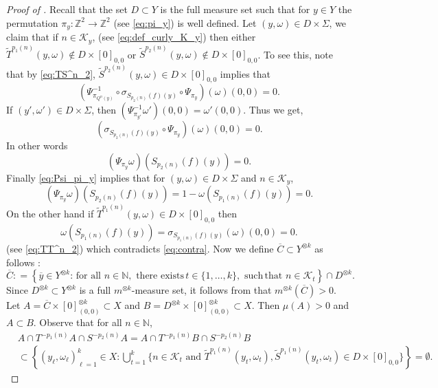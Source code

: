 \documentclass[12pt,reqno]{amsart}
\newcommand{\N}{\mathbb{N}}
\newcommand{\Z}{\mathbb{Z}}
\newcommand{\kay}{\mathcal{K}}
\newcommand{\TT}{\widetilde{T}}
\newcommand{\TS}{\widetilde{S}}
\theoremstyle{definition}
\begin{document}
\begin{proof}[Proof of ] Recall that the set $D \subset Y$ is the full measure set such that for $y \in Y$ the permutation $\pi_y: \Z^2 \rightarrow \Z^2$ (see \eqref{eq:pi_y}) is well defined. Let $(y,\omega) \in D \times \Sigma$, we claim that if $n \in \mathcal{K}_y$, (see \eqref{eq:def_curly_K_y}) then either $\TT^{p_1(n)} (y,\omega) \notin D \times [0]_{0,0} $ or $\TS^{p_2(n)} (y,\omega) \notin D \times [0]_{0,0}$. To see this, note that by \eqref{eq:TS^n_2}, $\TS^{p_2(n)} (y,\omega) \in D \times [0]_{0,0}$ implies that
\[
(\Psi^{-1}_{\pi_{Q^n(y)}} \circ \sigma_{S_{p_2(n)}(f)(y)} \circ \Psi_{\pi_y}) (\omega ) (0,0) = 0.
\]
If $(y',\omega') \in D \times \Sigma$, then $(\Psi^{-1}_{\pi_{y'}}\omega') (0,0) = \omega' (0,0)$. Thus we get,
\[
( \sigma_{S_{p_2(n)}(f)(y)} \circ \Psi_{\pi_y}) (\omega ) (0,0) = 0.
\] In other words
\[
(\Psi_{\pi_y} \omega ) (S_{p_2(n)}(f)(y)) = 0.
\] 
Finally \eqref{eq:Psi_pi_y} implies that for $(y,\omega) \in D \times \Sigma$ and $n\in \mathcal{K}_{y}$,
\begin{equation}\label{eq:contra}
   (\Psi_{\pi_y} \omega ) (S_{p_2(n)}(f)(y))=
1- \omega(S_{p_1(n)}(f)(y)) = 0. 
\end{equation}
On the other hand if $\TT^{p_1(n)} (y,\omega) \in D \times [0]_{0,0} $ then 
\[
\omega(S_{p_1(n)}(f)(y))=\sigma_{S_{p_1(n)}(f)(y)} (\omega) (0,0) = 0.
\]
(see \eqref{eq:TT^n_2}) which contradicts \eqref{eq:contra}. Now we define $\overline{C} \subset Y^{\otimes k}$ as follows :
\[
\overline{C} : = \left\{\overline{y} \in Y^{\otimes k} :\,\mathrm{for}\,\,\mathrm{all}\,\,n\in\N,\, \,\mathrm{there}\,\,\mathrm{exists}\, t \in \{1,\ldots,k\},\, \,\mathrm{such}\,\mathrm{that}\,\, n \in \kay_{t}\right\} \cap D^{\otimes k}. 
\]
Since $D^{\otimes k} \subset Y^{\otimes k}$ is a full $m^{\otimes k}$-measure set, it follows from  that $m^{\otimes k}(\overline{C})>0$. Let $A = \overline{C} \times [0]_{(0,0)}^{\otimes k} \subset X$ and $B = D^{\otimes k} \times [0]_{(0,0)}^{\otimes k} \subset X$. Then $\mu(A) > 0$ and $A \subset B$. Observe that for all $n \in \N$,
\begin{align*}
    &A \cap T^{-p_1(n)}A\cap S^{-p_2(n)}A =  A \cap T^{-p_1(n)}B\cap S^{-p_2(n)}B\\
    & \subset \left\{ (y_\ell,\omega_\ell)_{\ell=1}^k \in X :  \bigcup_{t=1}^k \{n \in \kay_t \,\, \mathrm{and}\,\, \TT^{p_1(n)}(y_t,\omega_t), \TS^{p_1(n)}(y_t,\omega_t) \in D \times [0]_{0,0} \} \right\} = \emptyset.
\end{align*}
    
\end{proof}
\end{document}
